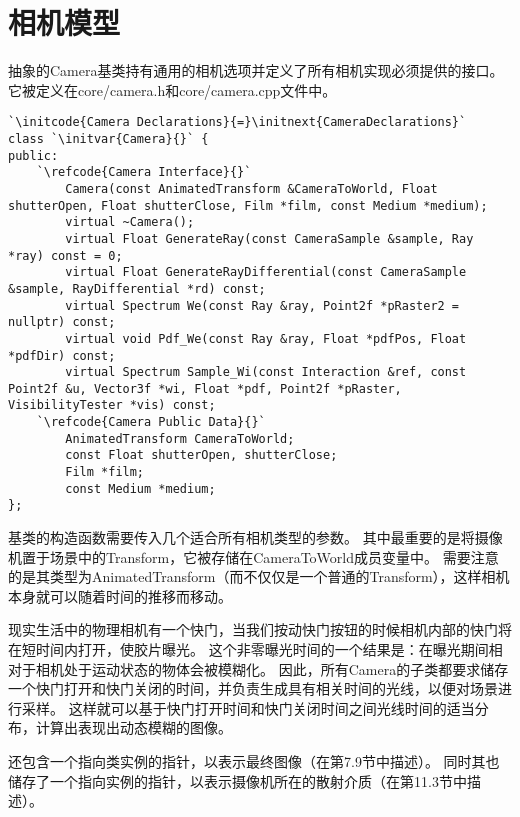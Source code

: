 \section{相机模型}\label{sec:相机模型}
抽象的Camera基类持有通用的相机选项并定义了所有相机实现必须提供的接口。它被定义在core/camera.h和core/camera.cpp文件中。
\begin{lstlisting}
`\initcode{Camera Declarations}{=}\initnext{CameraDeclarations}`
class `\initvar{Camera}{}` {
public:
    `\refcode{Camera Interface}{}`
        Camera(const AnimatedTransform &CameraToWorld, Float shutterOpen, Float shutterClose, Film *film, const Medium *medium);
        virtual ~Camera();
        virtual Float GenerateRay(const CameraSample &sample, Ray *ray) const = 0;
        virtual Float GenerateRayDifferential(const CameraSample &sample, RayDifferential *rd) const;
        virtual Spectrum We(const Ray &ray, Point2f *pRaster2 = nullptr) const;
        virtual void Pdf_We(const Ray &ray, Float *pdfPos, Float *pdfDir) const;
        virtual Spectrum Sample_Wi(const Interaction &ref, const Point2f &u, Vector3f *wi, Float *pdf, Point2f *pRaster, VisibilityTester *vis) const;
    `\refcode{Camera Public Data}{}`
        AnimatedTransform CameraToWorld;
        const Float shutterOpen, shutterClose;
        Film *film;
        const Medium *medium;
};

\end{lstlisting}
基类的构造函数需要传入几个适合所有相机类型的参数。
其中最重要的是将摄像机置于场景中的Transform，它被存储在CameraToWorld成员变量中。
需要注意的是其类型为AnimatedTransform（而不仅仅是一个普通的Transform），这样相机本身就可以随着时间的推移而移动。

现实生活中的物理相机有一个快门，当我们按动快门按钮的时候相机内部的快门将在短时间内打开，使胶片曝光。
这个非零曝光时间的一个结果是：在曝光期间相对于相机处于运动状态的物体会被模糊化。
因此，所有Camera的子类都要求储存一个快门打开和快门关闭的时间，并负责生成具有相关时间的光线，以便对场景进行采样。
这样就可以基于快门打开时间和快门关闭时间之间光线时间的适当分布，计算出表现出动态模糊的图像。

还包含一个指向类实例的指针，以表示最终图像（在第7.9节中描述）。
同时其也储存了一个指向实例的指针，以表示摄像机所在的散射介质（在第11.3节中描述）。

